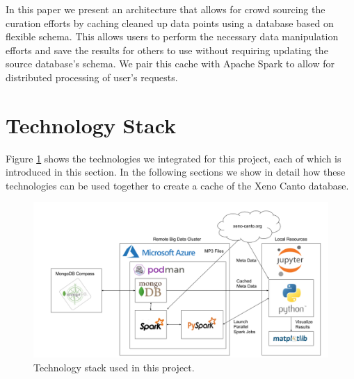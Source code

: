 \documentclass[conference,twoside]{IEEEtran}
\begin{document}
In this paper we present an architecture that allows for crowd sourcing the curation efforts by caching cleaned up data points using a database based on flexible schema. This allows users to perform the necessary data manipulation efforts and save the results for others to use without requiring updating the source database's schema. We pair this cache with Apache Spark to allow for distributed processing of user's requests.


\section{Technology Stack}
Figure \ref{fig:tech} shows the technologies we integrated for this project, each of which is introduced in this section. In the following sections we show in detail how these technologies can be used together to create a cache of the Xeno Canto database.
\begin{figure}[tb]  %
  \centering
  \includegraphics[width=\textwidth]{tech_stack}
  \caption{Technology stack used in this project.}
  \label{fig:tech}
\end{figure}
\end{document}
